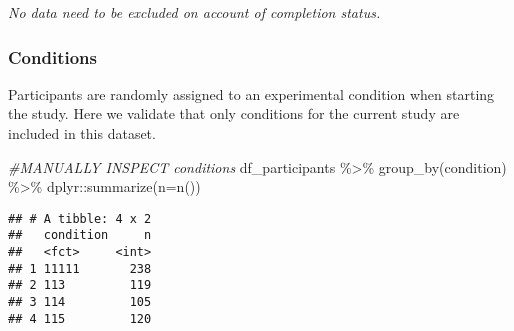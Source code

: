 \documentclass[
]{article}
\newenvironment{Shaded}{\begin{snugshade}}{\end{snugshade}}
\newcommand{\AttributeTok}[1]{\textcolor[rgb]{0.77,0.63,0.00}{#1}}
\newcommand{\CommentTok}[1]{\textcolor[rgb]{0.56,0.35,0.01}{\textit{#1}}}
\newcommand{\FunctionTok}[1]{\textcolor[rgb]{0.00,0.00,0.00}{#1}}
\newcommand{\NormalTok}[1]{#1}
\newcommand{\OtherTok}[1]{\textcolor[rgb]{0.56,0.35,0.01}{#1}}
\newcommand{\SpecialCharTok}[1]{\textcolor[rgb]{0.00,0.00,0.00}{#1}}
\newcommand{\StringTok}[1]{\textcolor[rgb]{0.31,0.60,0.02}{#1}}
\begin{document}
\begin{Shaded}
\end{Shaded}

\emph{No data need to be excluded on account of completion status.}

\hypertarget{conditions}{%
\subsubsection{Conditions}\label{conditions}}

Participants are randomly assigned to an experimental condition when
starting the study. Here we validate that only conditions for the
current study are included in this dataset.

\begin{Shaded}
\begin{Highlighting}[]
\CommentTok{\#MANUALLY INSPECT conditions}
\NormalTok{df\_participants }\SpecialCharTok{\%\textgreater{}\%} \FunctionTok{group\_by}\NormalTok{(condition) }\SpecialCharTok{\%\textgreater{}\%} 
\NormalTok{  dplyr}\SpecialCharTok{::}\FunctionTok{summarize}\NormalTok{(}\AttributeTok{n=}\FunctionTok{n}\NormalTok{())}
\end{Highlighting}
\end{Shaded}

\begin{verbatim}
## # A tibble: 4 x 2
##   condition     n
##   <fct>     <int>
## 1 11111       238
## 2 113         119
## 3 114         105
## 4 115         120
\end{verbatim}
\end{document}
